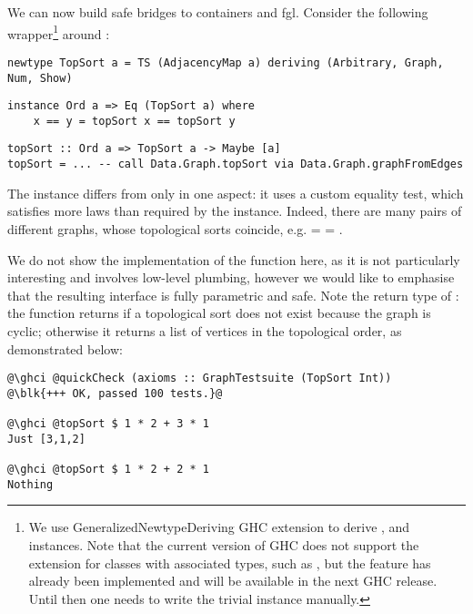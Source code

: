 We can now build safe bridges to \textsf{containers} and \textsf{fgl}. Consider
the following wrapper\footnote{We use \textsf{GeneralizedNewtypeDeriving} GHC
extension to derive ,  and  instances. Note that
the current version of GHC does not support the extension for classes
with associated types, such as , but the feature has already been
implemented and will be available in the next GHC release. Until then
one needs to write the trivial  instance manually.}
around :

\begin{verbatim}
newtype TopSort a = TS (AdjacencyMap a) deriving (Arbitrary, Graph, Num, Show)
\end{verbatim}
\vspace{1mm}
\begin{verbatim}
instance Ord a => Eq (TopSort a) where
    x == y = topSort x == topSort y
\end{verbatim}
\vspace{1mm}
\begin{verbatim}
topSort :: Ord a => TopSort a -> Maybe [a]
topSort = ... -- call Data.Graph.topSort via Data.Graph.graphFromEdges
\end{verbatim}

\noindent
The  instance differs from  only in one aspect: it uses
a custom equality test, which satisfies more laws than required by the 
instance. Indeed, there are many pairs of different graphs, whose topological sorts
coincide, e.g.  =  = .

We do not show the implementation of the  function here, as it is not
particularly interesting and involves low-level plumbing, however we would like to
emphasise that the resulting interface is fully parametric and safe. Note the
return type of : the function returns 
if a topological sort does not exist because the graph is cyclic; otherwise it
returns a list of vertices in the topological order, as demonstrated below:

\begin{verbatim}
@\ghci @quickCheck (axioms :: GraphTestsuite (TopSort Int))
@\blk{+++ OK, passed 100 tests.}@

@\ghci @topSort $ 1 * 2 + 3 * 1
Just [3,1,2]

@\ghci @topSort $ 1 * 2 + 2 * 1
Nothing
\end{verbatim}
